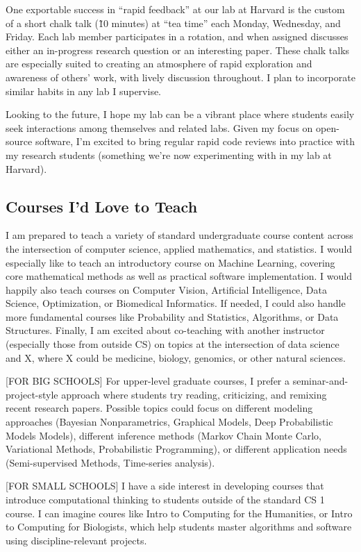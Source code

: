 \documentclass[11pt,letterpaper]{article}
\begin{document}
One exportable success in ``rapid feedback'' at our lab at Harvard is the custom of a short chalk talk (\~10 minutes) at ``tea time'' each Monday, Wednesday, and Friday. Each lab member participates in a rotation, and when assigned discusses either an in-progress research question or an interesting paper. 
These chalk talks are especially suited to creating an atmosphere of rapid exploration and awareness of others' work, with lively discussion throughout. I plan to incorporate similar habits in any lab I supervise. 

Looking to the future, I hope my lab can be a vibrant place where students easily seek interactions among themselves and related labs. Given my focus on open-source software, I'm excited to bring regular rapid code reviews into practice with my research students (something we're now experimenting with in my lab at Harvard).

\subsection*{Courses I'd Love to Teach}

I am prepared to teach a variety of standard undergraduate course content across the intersection of computer science, applied mathematics, and statistics. I would especially like to teach an introductory course on Machine Learning, covering core mathematical methods as well as practical software implementation. I would happily also teach courses on Computer Vision, Artificial Intelligence, Data Science, Optimization, or Biomedical Informatics. If needed, I could also handle more fundamental courses like Probability and Statistics, Algorithms, or Data Structures.
Finally, I am excited about co-teaching with another instructor (especially those from outside CS) on topics at the intersection of data science and X, where X could be medicine, biology, genomics, or other natural sciences.

[FOR BIG SCHOOLS] For upper-level graduate courses, I prefer a seminar-and-project-style approach where students try reading, criticizing, and remixing recent research papers. Possible topics could focus on different modeling approaches (Bayesian Nonparametrics, Graphical Models, Deep Probabilistic Models Models), different inference methods (Markov Chain Monte Carlo, Variational Methods, Probabilistic Programming), or different application needs (Semi-supervised Methods, Time-series analysis).

[FOR SMALL SCHOOLS]
I have a side interest in developing courses that introduce computational thinking to students outside of the standard CS 1 course. I can imagine coures like Intro to Computing for the Humanities, or Intro to Computing for Biologists, which help students master algorithms and software using discipline-relevant projects.
\end{document}
